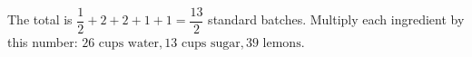 The total is $\dfrac{1}{2}+2+2+1+1=\dfrac{13}{2}$ standard batches. Multiply each ingredient by this number: $\boxed{26\text{ cups water},13\text{ cups sugar},39\text{ lemons}}$.
